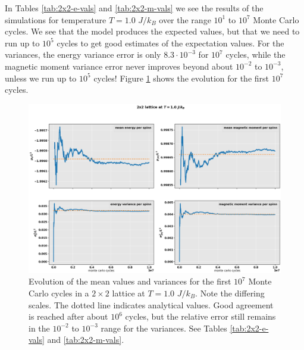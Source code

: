 \documentclass[]{article}
\begin{document}
In Tables \ref{tab:2x2-e-vals} and \ref{tab:2x2-m-vals} we see the results of the simulations for temperature $T=1.0$ $J/k_B$ over the range $10^1$ to $10^7$ Monte Carlo cycles. We see that the model produces the expected values, but that we need to run up to $10^5$ cycles to get good estimates of the expectation values. For the variances, the energy variance error is only $8.3 \cdot 10^{-3}$ for $10^7$ cycles, while the magnetic moment variance error never improves beyond about $10^{-2}$ to $10^{-3}$, unless we run up to $10^5$ cycles! Figure \ref{fig:2x2} shows the evolution for the first $10^7$ cycles.


\begin{figure}[!h]
	\centering
	\includegraphics[width=1\linewidth]{./figs/2x2.png}
	\caption{Evolution of the mean values and variances for the first $10^7$ Monte Carlo cycles in a $2 \times 2$ lattice at $T = 1.0$ $J/k_B$. Note the differing scales. The dotted line indicates analytical values. Good agreement is reached after about $10^6$ cycles, but the relative error still remains in the $10^{-2}$ to $10^{-3}$ range for the variances. See Tables \ref{tab:2x2-e-vals} and \ref{tab:2x2-m-vals}.}
	\label{fig:2x2}
\end{figure}
\end{document}

